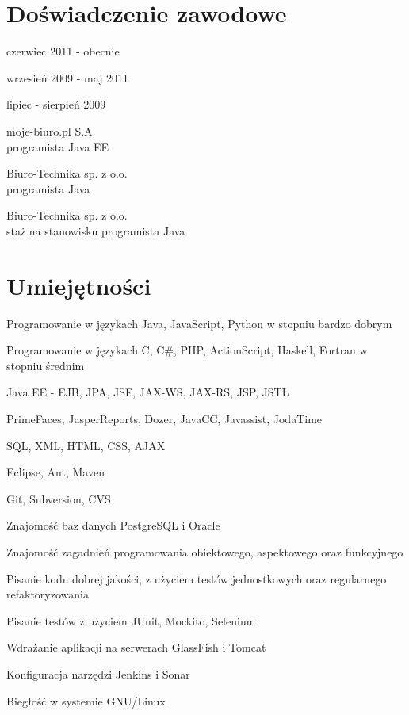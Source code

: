 \documentclass[letterpaper]{article}
\renewenvironment{itemize}{
  \begin{list}{}{
    \setlength{\leftmargin}{1.5em}
  }
}{
  \end{list}
}
\begin{document}
\section*{Doświadczenie zawodowe}

\begin{minipage}{0.30\linewidth}
  \begin{itemize}
    \item czerwiec 2011 - obecnie\\
    \item wrzesień 2009 - maj 2011\\
    \item lipiec - sierpień 2009\\
  \end{itemize}
\end{minipage}
\begin{minipage}{0.70\linewidth}
  \begin{itemize}
    \item moje-biuro.pl S.A.\\
      programista Java EE
    \item Biuro-Technika sp. z o.o.\\
      programista Java
    \item Biuro-Technika sp. z o.o.\\
      staż na stanowisku programista Java
  \end{itemize}
\end{minipage}


\section*{Umiejętności}

\begin{itemize}
\item Programowanie w językach Java, JavaScript, Python w stopniu bardzo dobrym
\item Programowanie w językach C, C\#, PHP, ActionScript, Haskell, Fortran w stopniu średnim
\item Java EE - EJB, JPA, JSF, JAX-WS, JAX-RS, JSP, JSTL
\item PrimeFaces, JasperReports, Dozer, JavaCC, Javassist, JodaTime
\item SQL, XML, HTML, CSS, AJAX
\item Eclipse, Ant, Maven
\item Git, Subversion, CVS
\item Znajomość baz danych PostgreSQL i Oracle
\item Znajomość zagadnień programowania obiektowego, aspektowego oraz funkcyjnego
\item Pisanie kodu dobrej jakości, z użyciem testów jednostkowych oraz regularnego refaktoryzowania
\item Pisanie testów z użyciem JUnit, Mockito, Selenium
\item Wdrażanie aplikacji na serwerach GlassFish i Tomcat
\item Konfiguracja narzędzi Jenkins i Sonar
\item Biegłość w systemie GNU/Linux
\end{itemize}
\end{document}
